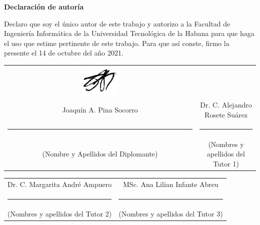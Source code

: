{\Large \textbf{Declaración de autoría} \vspace{.3cm}}

Declaro que soy el único autor de este trabajo y autorizo a la Facultad de Ingeniería Informática de la Universidad Tecnológica de la Habana para que haga el uso que estime pertinente de este trabajo. Para que así conste, firmo la presente el 14 de octubre del año 2021.

\vspace{4cm}

\begingroup	

\setlength{\tabcolsep}{30pt} %
\renewcommand{\arraystretch}{0.5} %
\hspace{-1.5cm}
\begin{tabular}{c c}
	
		\includegraphics[width=0.2\textwidth]{figuras/firma_jpinas.png}
	 & \\
	Joaquín A. Pina Socorro  & Dr. C. Alejandro Rosete Suárez \\
	\noindent\rule{6cm}{0.4pt} & \noindent\rule{6cm}{0.4pt} \\
	(Nombre y Apellidos del Diplomante) &  	(Nombres y apellidos del Tutor 1)	
\end{tabular}
\vspace{5cm}

\hspace{-1.3cm}
\begin{tabular}{c c}
	Dr. C. Margarita André Ampuero  & MSc. Ana Lilian Infante Abreu \\
	\noindent\rule{6cm}{0.4pt} & \noindent\rule{6cm}{0.4pt} \\
	(Nombres y apellidos del Tutor 2) &  	(Nombres y apellidos del Tutor 3)
\end{tabular}

\endgroup

